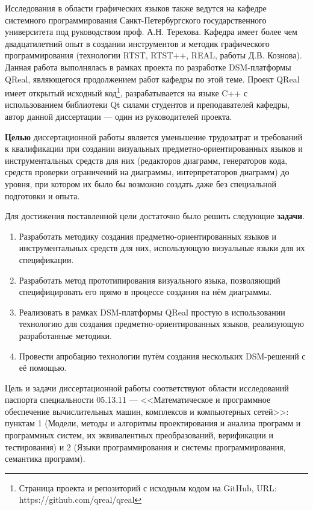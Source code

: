 Исследования в области графических языков также ведутся на кафедре системного программирования
Санкт-Петербургского государственного университета под руководством проф. А.Н. Терехова.
Кафедра имеет более чем двадцатилетний опыт в создании инструментов и методик графического
программирования (технологии RTST, RTST++, REAL, работы Д.В. Кознова). Данная работа 
выполнялась в рамках проекта по разработке DSM-платформы QReal, являющегося продолжением
работ кафедры по этой теме. Проект QReal имеет открытый исходный код\footnote{Страница 
проекта и репозиторий с исходным кодом на GitHub, URL: https://github.com/qreal/qreal}, 
разрабатывается на языке C++ с использованием библиотеки Qt силами студентов и преподавателей 
кафедры, автор данной диссертации --- один из руководителей проекта.

\textbf{Целью} диссертационной работы является уменьшение трудозатрат и требований к квалификации
при создании визуальных предметно-ориентированных языков и инструментальных средств для них (редакторов диаграмм, 
генераторов кода, средств проверки ограничений на диаграммы, интерпретаторов диаграмм)
до уровня, при котором их было бы возможно создать даже без специальной подготовки и опыта.

Для достижения поставленной цели достаточно было решить следующие \textbf{задачи}.
\begin{enumerate}
	\item Разработать методику создания предметно-ориентированных языков и инструментальных 
		средств для них, использующую визуальные языки для их спецификации.
	\item Разработать метод прототипирования визуального языка, позволяющий специфицировать его
		прямо в процессе создания на нём диаграммы.
	\item Реализовать в рамках DSM-платформы QReal простую в использовании технологию 
		для создания предметно-ориентированных языков, реализующую разработанные методики.
	\item Провести апробацию технологии путём создания нескольких DSM-решений с её помощью.
\end{enumerate}

Цель и задачи диссертационной работы соответствуют области исследований паспорта специальности 
05.13.11 --- <<Математическое и программное обеспечение вычислительных машин, комплексов и компьютерных сетей>>: 
пунктам 1 (Модели, методы и алгоритмы проектирования и анализа программ и программных 
систем, их эквивалентных преобразований, верификации и тестирования) и 2 (Языки программирования 
и системы программирования, семантика программ).

